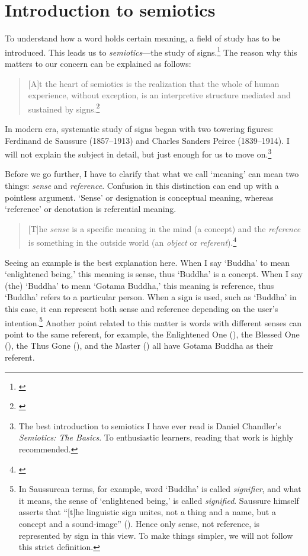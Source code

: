 {}
\section*{Introduction to semiotics}

To understand how a word holds certain meaning, a field of study has to be introduced. This leads us to \emph{semiotics}---the study of signs.\footnote{\citealp[p.~2]{chandler:semiotics}} The reason why this matters to our concern can be explained as follows:

\begin{quote}
[A]t the heart of semiotics is the realization that the whole of human experience, without exception, is an interpretive structure mediated and sustained by signs.\footnote{\citealp[p.~5]{deely:basics}}
\end{quote}

In modern era, systematic study of signs began with two towering figures: Ferdinand de Saussure (1857--1913) and Charles Sanders Peirce (1839--1914). I will not explain the subject in detail, but just enough for us to move on.\footnote{The best introduction to semiotics I have ever read is Daniel Chandler's \emph{Semiotics: The Basics}. To enthusiastic learners, reading that work is highly recommended.}

Before we go further, I have to clarify that what we call `meaning' can mean two things: \emph{sense} and \emph{reference}. Confusion in this distinction can end up with a pointless argument. `Sense' or designation is conceptual meaning, whereas `reference' or denotation is referential meaning.

\begin{quote}
[T]he \emph{sense} is a specific meaning in the mind (a concept) and the \emph{reference} is something in the outside world (an \emph{object} or \emph{referent}).\footnote{\citealp[p.~11]{chandler:semiotics}}
\end{quote}

Seeing an example is the best explanation here. When I say `Buddha' to mean `enlightened being,' this meaning is sense, thus `Buddha' is a concept. When I say (the) `Buddha' to mean `Gotama Buddha,' this meaning is reference, thus `Buddha' refers to a particular person. When a sign is used, such as `Buddha' in this case, it can represent both sense and reference depending on the user's intention.\footnote{In Saussurean terms, for example, word `Buddha' is called \emph{signifier}, and what it means, the sense of `enlightened being,' is called \emph{signified}. Saussure himself asserts that ``[t]he linguistic sign unites, not a thing and a name, but a concept and a sound-image'' (\citealp[p.~66]{saussure:course}). Hence only sense, not reference, is represented by sign in this view. To make things simpler, we will not follow this strict definition.} Another point related to this matter is words with different senses can point to the same referent, for example, the Enlightened One (), the Blessed One (), the Thus Gone (), and the Master () all have Gotama Buddha as their referent.


